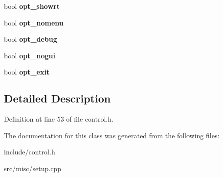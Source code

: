 \begin{DoxyCompactItemize}
\item 
\hypertarget{classConfig_a0b78abf9471b6a2d04d228be7e6792f2}{bool {\bfseries opt\-\_\-showrt}}\label{classConfig_a0b78abf9471b6a2d04d228be7e6792f2}

\item 
\hypertarget{classConfig_ace74f2fb3b918cc45b2486a59281cafc}{bool {\bfseries opt\-\_\-nomenu}}\label{classConfig_ace74f2fb3b918cc45b2486a59281cafc}

\item 
\hypertarget{classConfig_a7d68ad804907496b417a951ed1eada22}{bool {\bfseries opt\-\_\-debug}}\label{classConfig_a7d68ad804907496b417a951ed1eada22}

\item 
\hypertarget{classConfig_ae904e5c4af1cac4af77feb7af250ad29}{bool {\bfseries opt\-\_\-nogui}}\label{classConfig_ae904e5c4af1cac4af77feb7af250ad29}

\item 
\hypertarget{classConfig_a9f68df279656da4abd730ffa83fbb38a}{bool {\bfseries opt\-\_\-exit}}\label{classConfig_a9f68df279656da4abd730ffa83fbb38a}

\end{DoxyCompactItemize}


\subsection{Detailed Description}


Definition at line 53 of file control.\-h.



The documentation for this class was generated from the following files\-:\begin{DoxyCompactItemize}
\item 
include/control.\-h\item 
src/misc/setup.\-cpp\end{DoxyCompactItemize}
